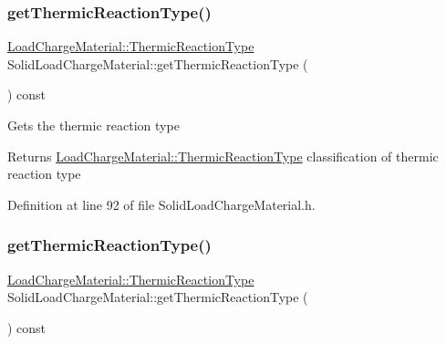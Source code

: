 \mbox{\label{class_solid_load_charge_material_a11708312a99ab985d980e1e521e0864c}} 
\subsubsection{\texorpdfstring{get\+Thermic\+Reaction\+Type()}{getThermicReactionType()}\hspace{0.1cm}{\footnotesize\ttfamily [2/3]}}
{\footnotesize\ttfamily \hyperlink{class_load_charge_material_a51d4263e865a5d86236622dd3fe23fd1}{Load\+Charge\+Material\+::\+Thermic\+Reaction\+Type} Solid\+Load\+Charge\+Material\+::get\+Thermic\+Reaction\+Type (\begin{DoxyParamCaption}{ }\end{DoxyParamCaption}) const\hspace{0.3cm}{\ttfamily [inline]}}

Gets the thermic reaction type \begin{DoxyReturn}{Returns}
\hyperlink{class_load_charge_material_a51d4263e865a5d86236622dd3fe23fd1}{Load\+Charge\+Material\+::\+Thermic\+Reaction\+Type} classification of thermic reaction type 
\end{DoxyReturn}


Definition at line 92 of file Solid\+Load\+Charge\+Material.\+h.

\mbox{\label{class_solid_load_charge_material_a11708312a99ab985d980e1e521e0864c}} 
\subsubsection{\texorpdfstring{get\+Thermic\+Reaction\+Type()}{getThermicReactionType()}\hspace{0.1cm}{\footnotesize\ttfamily [3/3]}}
{\footnotesize\ttfamily \hyperlink{class_load_charge_material_a51d4263e865a5d86236622dd3fe23fd1}{Load\+Charge\+Material\+::\+Thermic\+Reaction\+Type} Solid\+Load\+Charge\+Material\+::get\+Thermic\+Reaction\+Type (\begin{DoxyParamCaption}{ }\end{DoxyParamCaption}) const\hspace{0.3cm}{\ttfamily [inline]}}

